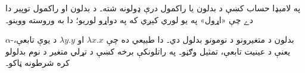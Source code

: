 \documentclass[../../../include/open-logic-section]{subfiles}
\begin{document}

په لامبډا حساب کښې د بدلون يا راکمول درې ډولونه شته۔ د بدلون او راکمول توپير دا دے چې «اړول» په يو لوري کېږي که په دواړو لوريو؛ دا به وروسته ووينو۔

$\alpha$-بدلون د متغيرونو د نومونو بدلول دي۔ دا طبيعي ده چې $\lambda x. x$ او $\lambda y.y$ د يوې تابعې، يعنې د عينيت تابعې، تمثيل وګڼو۔ په راتلونکې برخه کښې د تړلي متغير د نوم بدلولو کره شرطونه ټاکو۔
\end{document}

